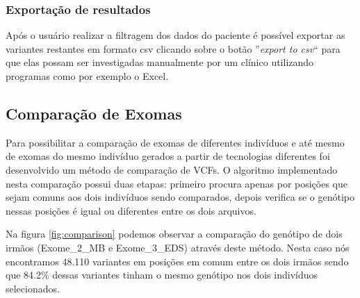 \subsubsection{Exportação de resultados}

Após o usuário realizar a filtragem dos dados do paciente é possível exportar as variantes restantes em formato csv clicando sobre o botão ''\textit{export to csv}`` para que elas possam ser investigadas manualmente por um clínico utilizando programas como por exemplo o Excel.

\subsection{Comparação de Exomas}

Para possibilitar a comparação de exomas de diferentes indivíduos e até mesmo de exomas do mesmo indivíduo gerados a partir de tecnologias diferentes foi desenvolvido um método de comparação de VCFs. O algoritmo implementado nesta comparação possui duas etapas: primeiro procura apenas por posições que sejam comuns aos dois indivíduos sendo comparados, depois verifica se o genótipo nessas posições é igual ou diferentes entre os dois arquivos.

Na figura \ref{fig:comparison} podemos observar a comparação do genótipo de dois irmãos (Exome\_2\_MB e Exome\_3\_EDS) através deste método. Nesta caso nós encontramos 48.110 variantes em posições em comum entre os dois irmãos sendo que 84.2\% dessas variantes tinham o mesmo genótipo nos dois indivíduos selecionados.

